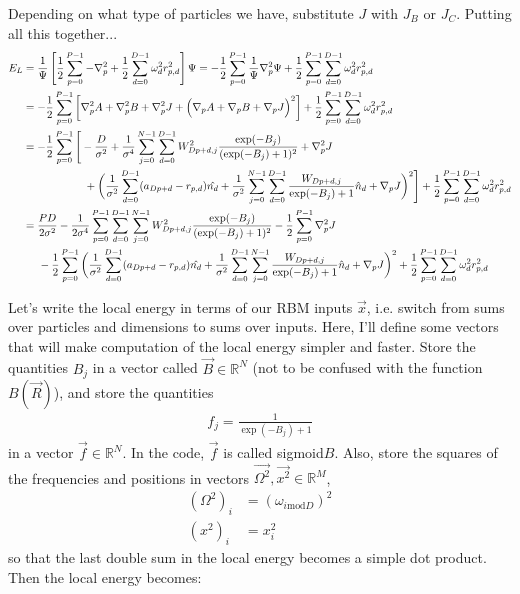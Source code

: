 \documentclass[12pt]{article}
\begin{document}
\noindent Depending on what type of particles we have, substitute $J$ with $J_B$ or $J_C$. Putting all this together...
\begin{align*}
E_L &= \frac{1}{\Psi} \left[ \frac{1}{2} \sum_{p=0}^{P-1} -\nabla_p^2 + \frac{1}{2}\sum_{d=0}^{D-1} \omega_d^2r_{p,d}^2 \right] \Psi = -\frac{1}{2} \sum_{p=0}^{P-1} \frac{1}{\Psi} \nabla_p^2 \Psi + \frac{1}{2} \sum_{p=0}^{P-1} \sum_{d=0}^{D-1} \omega_d^2r_{p,d}^2\\
&= -\frac{1}{2} \sum_{p=0}^{P-1} 
\bigg[ \nabla_p^2  A   + \nabla_p^2  B   + \nabla_p^2  J  + \Big( \nabla_p  A   + \nabla_p  B   + \nabla_p  J \Big)^2 \bigg]
+ \frac{1}{2} \sum_{p=0}^{P-1} \sum_{d=0}^{D-1} \omega_d^2r_{p,d}^2\\
&= -\frac{1}{2} \sum_{p=0}^{P-1} 
\Bigg[ -\frac{D}{\sigma^2}  
+ \frac{1}{\sigma^4} \sum_{j=0}^{N-1} \sum_{d=0}^{D-1} W_{Dp+d,j}^2 \frac{\exp(-B_j)}{(\exp(-B_j)+1)^2}
 + \nabla_p^2  J  \\
& \hspace*{20mm}+ \bigg( \frac{1}{\sigma^2} \sum_{d=0}^{D-1}(a_{Dp+d}-r_{p,d}) \hat{n_{d}}  + \frac{1}{\sigma^2} \sum_{j=0}^{N-1} \sum_{d=0}^{D-1} \frac{W_{Dp+d,j}}{\exp(-B_j)+1}  \hat{n}_d
 + \nabla_p  J \bigg)^2 \Bigg]
+ \frac{1}{2} \sum_{p=0}^{P-1} \sum_{d=0}^{D-1} \omega_d^2r_{p,d}^2\\
&= \frac{PD}{2\sigma^2} - \frac{1}{2\sigma^4} \sum_{p=0}^{P-1} \sum_{d=0}^{D-1} \sum_{j=0}^{N-1} W_{Dp+d,j}^2 \frac{\exp(-B_j)}{(\exp(-B_j)+1)^2} - \frac{1}{2} \sum_{p=0}^{P-1} \nabla_p^2  J\\
& \hspace*{5 mm} -\frac{1}{2} \sum_{p=0}^{P-1} \bigg( \frac{1}{\sigma^2} \sum_{d=0}^{D-1}(a_{Dp+d}-r_{p,d}) \hat{n_{d}}  + \frac{1}{\sigma^2} \sum_{d=0}^{D-1} \sum_{j=0}^{N-1} \frac{W_{Dp+d,j}}{\exp(-B_j)+1}  \hat{n}_d
 + \nabla_p  J \bigg)^2 + \frac{1}{2} \sum_{p=0}^{P-1} \sum_{d=0}^{D-1} \omega_d^2r_{p,d}^2\\
\end{align*}

\noindent Let's write the local energy in terms of our RBM inputs $\vec{x}$, i.e. switch from sums over particles and dimensions to sums over inputs. Here, I'll define some vectors that will make computation of the local energy simpler and faster. Store the quantities $B_j$ in a vector called $\vec{B} \in \mathbb{R}^N$ (not to be confused with the function $B(\vec{R})$), and store the quantities
\begin{align*}
f_{j} = \frac{1}{\exp(-B_j)+1}
\end{align*}
in a vector $\vec{f} \in \mathbb{R}^N$. In the code, $\vec{f}$ is called sigmoid$B$. Also, store the squares of the frequencies and positions in vectors $\vec{\Omega^2}, \vec{x^2} \in \mathbb{R}^M$,
\begin{align*}
(\Omega^2)_i &= (\omega_{i \text{mod} D})^2\\
(x^2)_i &= x_i^2
\end{align*}
so that the last double sum in the local energy becomes a simple dot product.
 Then the local energy becomes:
\end{document}
